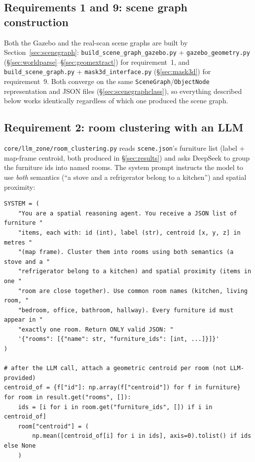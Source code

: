 \documentclass[11pt]{article}
\begin{document}
\subsection*{Requirements 1 and 9: scene graph construction}

Both the Gazebo and the real-scan scene graphs are built by
Section~\ref{sec:scenegraph}: \texttt{build\_scene\_graph\_gazebo.py} +
\texttt{gazebo\_geometry.py} (\S\ref{sec:worldparse}--\S\ref{sec:geomextract})
for requirement~1, and \texttt{build\_scene\_graph.py} +
\texttt{mask3d\_interface.py} (\S\ref{sec:mask3d}) for requirement~9. Both
converge on the same \texttt{SceneGraph}/\texttt{ObjectNode} representation
and JSON files (\S\ref{sec:scenegraphclass}), so everything described below
works identically regardless of which one produced the scene graph.

\subsection{Requirement 2: room clustering with an LLM}
\label{sec:rooms}

\texttt{core/llm\_zone/room\_clustering.py} reads \texttt{scene.json}'s
furniture list (label + map-frame centroid, both produced in
\S\ref{sec:results}) and asks DeepSeek to group the furniture ids into named
rooms. The system prompt instructs the model to use \emph{both} semantics
(``a stove and a refrigerator belong to a kitchen'') and spatial proximity:

\begin{lstlisting}[caption={\texttt{room\_clustering.py}: the clustering prompt and centroid attachment (lines 31--40, 73--80)}]
SYSTEM = (
    "You are a spatial reasoning agent. You receive a JSON list of furniture "
    "items, each with: id (int), label (str), centroid [x, y, z] in metres "
    "(map frame). Cluster them into rooms using both semantics (a stove and a "
    "refrigerator belong to a kitchen) and spatial proximity (items in one "
    "room are close together). Use common room names (kitchen, living room, "
    "bedroom, office, bathroom, hallway). Every furniture id must appear in "
    "exactly one room. Return ONLY valid JSON: "
    '{"rooms": [{"name": str, "furniture_ids": [int, ...]}]}'
)

# after the LLM call, attach a geometric centroid per room (not LLM-provided)
centroid_of = {f["id"]: np.array(f["centroid"]) for f in furniture}
for room in result.get("rooms", []):
    ids = [i for i in room.get("furniture_ids", []) if i in centroid_of]
    room["centroid"] = (
        np.mean([centroid_of[i] for i in ids], axis=0).tolist() if ids else None
    )
\end{lstlisting}
\end{document}
